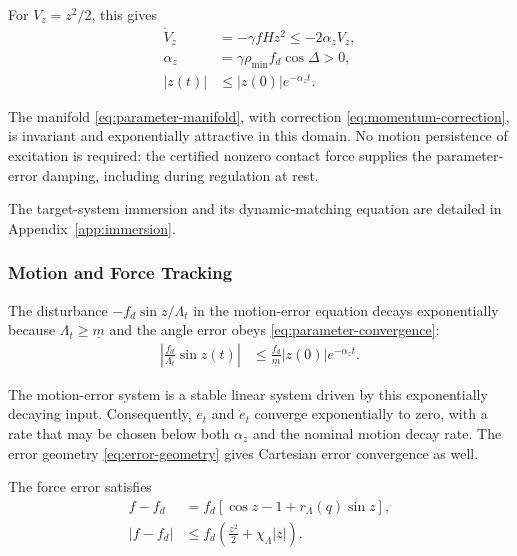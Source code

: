 \documentclass[10pt,journal,letterpaper]{IEEEtran}
\begin{document}
For $V_z=z^2/2$, this gives
\begin{align}
\dot V_z&=-\gamma fHz^2\leq-2\alpha_zV_z,\nonumber\\
\alpha_z&=\gamma\rho_{\min}f_d\cos\Delta>0,\label{eq:parameter-rate}\\
|z(t)|&\leq|z(0)|e^{-\alpha_z t}.\label{eq:parameter-convergence}
\end{align}

The manifold \eqref{eq:parameter-manifold}, with correction \eqref{eq:momentum-correction}, is invariant and exponentially attractive in this domain. No motion persistence of excitation is required: the certified nonzero contact force supplies the parameter-error damping, including during regulation at rest.

The target-system immersion and its dynamic-matching equation are detailed in Appendix~\ref{app:immersion}.

\subsubsection{Motion and Force Tracking}

The disturbance $-f_d\sin z/\Lambda_t$ in the motion-error equation decays exponentially because $\Lambda_t\geq\underline m$ and the angle error obeys \eqref{eq:parameter-convergence}:
\begin{equation}\label{eq:motion-disturbance-bound}
\begin{aligned}
\left|\frac{f_d}{\Lambda_t}\sin z(t)\right|
&\leq\frac{f_d}{\underline m}|z(0)|e^{-\alpha_z t}.
\end{aligned}
\end{equation}

The motion-error system is a stable linear system driven by this exponentially decaying input. Consequently, $e_t$ and $\dot e_t$ converge exponentially to zero, with a rate that may be chosen below both $\alpha_z$ and the nominal motion decay rate. The error geometry \eqref{eq:error-geometry} gives Cartesian error convergence as well.

The force error satisfies
\begin{equation}\label{eq:force-error-bound}
\begin{aligned}
f-f_d&=f_d\left[\cos z-1+r_\Lambda(q)\sin z\right],\\
|f-f_d|
&\leq f_d\left(\frac{z^2}{2}+\chi_\Lambda|z|\right).
\end{aligned}
\end{equation}
\end{document}
